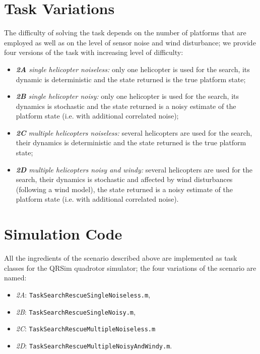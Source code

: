 \documentclass[a4paper,11pt]{report}
\newcommand{\sname}{QRSim\xspace}
\newcommand\mytexttt[1]{\texttt{\hyphenchar\font=45\relax #1}}
\begin{document}
\section{Task Variations} \label{SearchRescueVariations}
The difficulty of solving the task depends on the number of platforms that are employed as well as on the level of sensor noise and wind disturbance; we provide four versions of the task with increasing level of difficulty:
\begin{itemize}
 \item \textit{\textbf{2A} single helicopter noiseless:} only one helicopter is used for the search, its dynamic is deterministic and the state returned is the true platform state;
 \item \textit{\textbf{2B} single helicopter noisy:} only one helicopter is used for the search, its dynamics is stochastic and the state returned is a noisy estimate of the platform state (i.e. with additional correlated noise);
 \item \textit{\textbf{2C} multiple helicopters noiseless:} several helicopters are used for the search, their dynamics is deterministic and the state returned is the true platform state;
 \item \textit{\textbf{2D} multiple helicopters noisy and windy:} several helicopters are used for the search, their dynamics is stochastic and affected by wind disturbances (following a wind model), the state returned is a noisy estimate of the platform state (i.e. with additional correlated noise).
\end{itemize}

\section{Simulation Code} \label{SearchRescueSim}

All the ingredients of the scenario described above are implemented as task classes for the \sname quadrotor simulator; the four variations of the scenario are named:
\begin{itemize}
\item\textit{2A}: \mytexttt{TaskSearchRescueSingleNoiseless.m}, 
\item\textit{2B}: \mytexttt{TaskSearchRescueSingleNoisy.m}, 
\item\textit{2C}: \mytexttt{TaskSearchRescueMultipleNoiseless.m} 
\item\textit{2D}: \mytexttt{TaskSearchRescueMultipleNoisyAndWindy.m}. 
\end{itemize}
\end{document}
